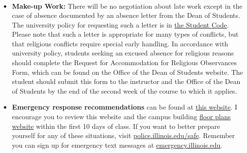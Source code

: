 \documentclass[11pt, a4paper]{article}
\begin{document}
\begin{itemize}
\begin{align*}
\end{align*}
\item[] \textbf{Make-up Work:} There will be no negotiation about late work 
        except in the case of absence documented by an absence letter from the 
                Dean of Students.  The university policy for requesting such a 
                letter is in 
                \href{http://studentcode.illinois.edu/article1_part5_1-501.html}{the 
                Student Code}. Please note that such a letter is appropriate 
                for many types of conflicts, but that religious conflicts 
                require special early handling. In accordance with university 
                policy, students seeking an excused absence for religious 
                reasons should complete the Request for Accommodation for 
                Religious Observances Form, which can be found on the Office of 
                the Dean of Students website. The student should submit this 
                form to the instructor and the Office of the Dean of Students 
                by the end of the second week of the course to which it 
                applies.
\item[]\textbf{Emergency response recommendations} can be found at
        \href{http://police.illinois.edu/em/planning/emergency-response-guide/}{this website}.
        I encourage you to review this website and the campus building
        \href{http://police.illinois.edu/emergency-preparedness/building-emergency-action-plans/}{floor
        plans website} within the first 10 days of class.  If you want to
        better prepare yourself for any of these situations, visit
        \href{http://police.illinois.edu/safe}{police.illinois.edu/safe}. Remember you can sign up for emergency
        text messages at \href{http://emergency.illinois.edu}{emergency.illinois.edu}.
\end{itemize}
\end{document}
